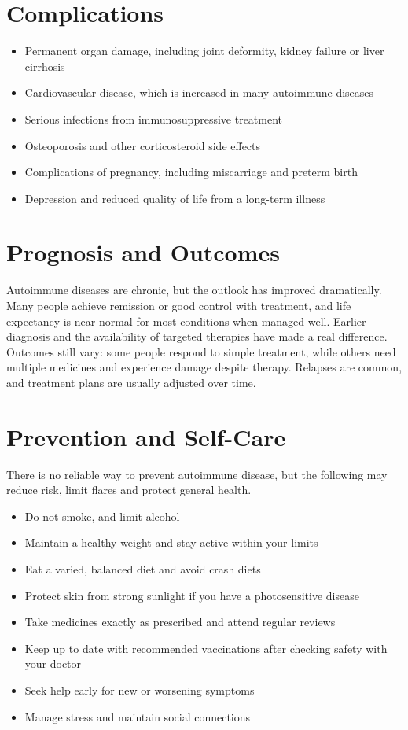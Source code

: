 \section*{Complications}
\begin{itemize}
    \item Permanent organ damage, including joint deformity, kidney failure or liver cirrhosis
    \item Cardiovascular disease, which is increased in many autoimmune diseases
    \item Serious infections from immunosuppressive treatment
    \item Osteoporosis and other corticosteroid side effects
    \item Complications of pregnancy, including miscarriage and preterm birth
    \item Depression and reduced quality of life from a long-term illness
\end{itemize}

\section*{Prognosis and Outcomes}
Autoimmune diseases are chronic, but the outlook has improved dramatically. Many people achieve remission or good control with treatment, and life expectancy is near-normal for most conditions when managed well. Earlier diagnosis and the availability of targeted therapies have made a real difference. Outcomes still vary: some people respond to simple treatment, while others need multiple medicines and experience damage despite therapy. Relapses are common, and treatment plans are usually adjusted over time.

\section*{Prevention and Self-Care}
There is no reliable way to prevent autoimmune disease, but the following may reduce risk, limit flares and protect general health.

\begin{itemize}
    \item Do not smoke, and limit alcohol
    \item Maintain a healthy weight and stay active within your limits
    \item Eat a varied, balanced diet and avoid crash diets
    \item Protect skin from strong sunlight if you have a photosensitive disease
    \item Take medicines exactly as prescribed and attend regular reviews
    \item Keep up to date with recommended vaccinations after checking safety with your doctor
    \item Seek help early for new or worsening symptoms
    \item Manage stress and maintain social connections
\end{itemize}

